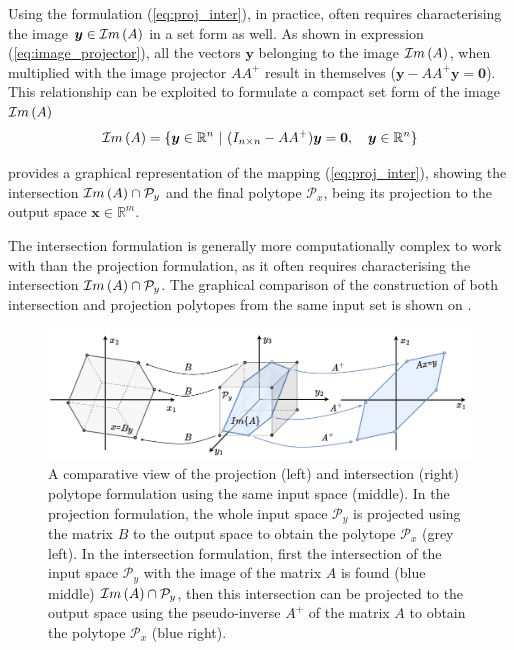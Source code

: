 Using the formulation (\ref{eq:proj_inter}), in practice, often requires characterising the image $\bm{y}\in\mathcal{I}m\left(A\right)$ in a set form as well. As shown in expression (\ref{eq:image_projector}), all the vectors $\bm{y}$ belonging to the image $\mathcal{I}m\left(A\right)$, when multiplied with the image projector $AA^+$ result in themselves ($\bm{y} - AA^+\bm{y} = \bm{0}$). This relationship can be exploited to formulate a compact set form of the image $\mathcal{I}m\left(A\right)$ 
\begin{equation}
   \mathcal{I}m\left(A\right) = \{ \bm{y}\in\mathbb{R}^n ~|~(I_{n\times n} - AA^+)\bm{y} = \bm{0}, \quad \bm{y}\in\mathbb{R}^n \}
   \label{eq:image_poly}
\end{equation}

 provides a graphical representation of the mapping (\ref{eq:proj_inter}), showing the intersection $\mathcal{I}m\left(A\right)\cap\mathcal{P}_y$ and the final polytope $\mathcal{P}_x$, being its projection to the output space $\bm{x}\in \mathbb{R}^m$. 

The intersection formulation is generally more computationally complex to work with than the projection formulation, as it often requires characterising the intersection $\mathcal{I}m\left(A\right)\cap\mathcal{P}_y$. The graphical comparison of the construction of both intersection and projection polytopes from the same input set is shown on .


\begin{figure}
    \centering
    \includegraphics[width=\linewidth]{Chapters/imgs/intersection_projection.pdf}
    \caption{A comparative view of the projection (left) and intersection (right) polytope formulation using the same input space (middle). In the projection formulation, the whole input space $\mathcal{P}_y$ is projected using the matrix $B$ to the output space to obtain the polytope $\mathcal{P}_x$ (grey left). In the intersection formulation, first the intersection of the input space $\mathcal{P}_y$ with the image of the matrix $A$ is found (blue middle) $\mathcal{I}m\left(A\right) \cap \mathcal{P}_y$, then this intersection can be projected to the output space using the pseudo-inverse $A^+$ of the matrix $A$ to obtain the polytope $\mathcal{P}_x$ (blue right).}
    \label{fig:inter_proj}
\end{figure}

